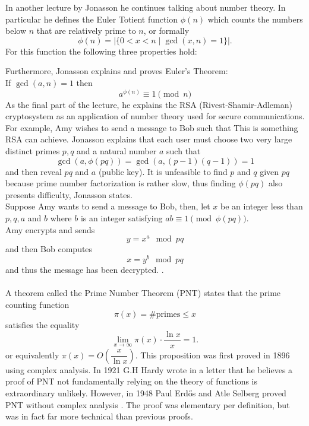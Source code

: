 
In another lecture by Jonasson he continues talking about number theory. In particular he defines the Euler Totient function $\phi(n)$ which counts the numbers below $n$ that are relatively prime to $n$, or formally 
$$\phi(n)=\left|\{0 < x < n \mid \gcd{(x,n)=1}\}\right|.$$
For this function the following three properties hold:

Furthermore, Jonasson explains and proves Euler's Theorem:\\
If $\gcd{(a,n)}=1$ then
$$a^{\phi{(n)}}\equiv 1 \pmod{n}$$
As the final part of the lecture, he explains the RSA (Rivest-Shamir-Adleman) cryptosystem as an application of number theory used for secure communications. For example, Amy wishes to send a message to Bob such that
This is something RSA can achieve. Jonasson explains that each user must choose two very large distinct primes $p,q$ and a natural number $a$ such that 
$$\gcd{(a,\phi{(pq)})}=\gcd{(a,(p-1)(q-1))}=1$$
and then reveal $pq$ and $a$ (public key). It is unfeasible to find $p$ and $q$ given $pq$ because prime number factorization is rather slow, thus finding $\phi{(pq)}$ also presents difficulty, Jonasson states. \\
Suppose Amy wants to send a message to Bob, then, let $x$ be an integer less than $p,q,a$ and $b$ where $b$ is an integer satisfying $ab\equiv 1 \pmod{\phi{(pq)}}$.\\
Amy encrypts and sends
$$y=x^a \mod pq$$
and then Bob computes
$$x=y^b \mod{pq}$$
and thus the message has been decrypted.
\cite{talteori2}.
\\\\
A theorem called the Prime Number Theorem (PNT) states that the prime counting function $$\pi(x)= \text{\# primes} \leq x$$ satisfies the equality $$\lim_{x\to \infty}\pi(x) \cdot \frac{\ln x}{x}=1.$$
or equivalently $\pi(x) = O\left(\dfrac{x}{\ln x}\right)$.
This proposition was first proved in 1896 using complex analysis. In 1921 G.H Hardy wrote in a letter that he believes a proof of PNT not fundamentally relying on the theory of functions is extraordinary unlikely. However, in 1948 Paul Erdős and Atle Selberg proved PNT without complex analysis \cite{Goldfeld2004}\cite{numbertheory:analytic}. The proof was elementary per definition, but was in fact far more technical than previous proofs. \\

